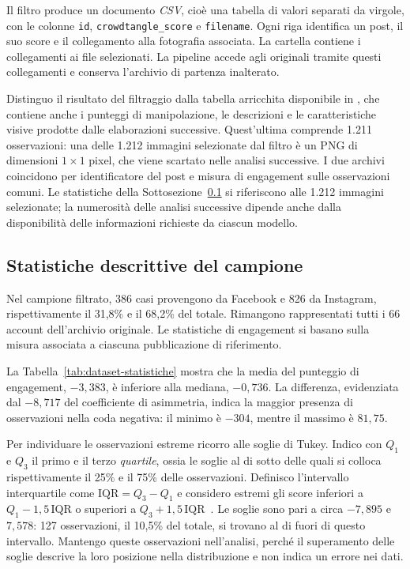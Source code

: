 Il filtro produce un documento \emph{CSV}, cioè una tabella di valori separati da virgole, con le colonne \texttt{id}, \texttt{crowdtangle\_score} e \texttt{filename}. Ogni riga identifica un post, il suo score e il collegamento alla fotografia associata. La cartella  contiene i collegamenti ai file selezionati. La pipeline accede agli originali tramite questi collegamenti e conserva l'archivio di partenza inalterato.

Distinguo il risultato del filtraggio dalla tabella arricchita disponibile in , che contiene anche i punteggi di manipolazione, le descrizioni e le caratteristiche visive prodotte dalle elaborazioni successive. Quest'ultima comprende 1.211 osservazioni: una delle 1.212 immagini selezionate dal filtro è un PNG di dimensioni $1 \times 1$ pixel, che viene scartato nelle analisi successive. I due archivi coincidono per identificatore del post e misura di engagement sulle osservazioni comuni. Le statistiche della Sottosezione~\ref{subsec:dataset-statistiche} si riferiscono alle 1.212 immagini selezionate; la numerosità delle analisi successive dipende anche dalla disponibilità delle informazioni richieste da ciascun modello.

\subsection{Statistiche descrittive del campione}
\label{subsec:dataset-statistiche}

Nel campione filtrato, 386 casi provengono da Facebook e 826 da Instagram, rispettivamente il 31,8\% e il 68,2\% del totale. Rimangono rappresentati tutti i 66 account dell'archivio originale. Le statistiche di engagement si basano sulla misura associata a ciascuna pubblicazione di riferimento.

La Tabella~\ref{tab:dataset-statistiche} mostra che la media del punteggio di engagement, $-3{,}383$, è inferiore alla mediana, $-0{,}736$. La differenza, evidenziata dal $-8{,}717$ del coefficiente di asimmetria, indica la maggior presenza di osservazioni nella coda negativa: il minimo è $-304$, mentre il massimo è $81{,}75$.

Per individuare le osservazioni estreme ricorro alle soglie di Tukey. Indico con $Q_1$ e $Q_3$ il primo e il terzo \emph{quartile}, ossia le soglie al di sotto delle quali si colloca rispettivamente il 25\% e il 75\% delle osservazioni. Definisco l'intervallo interquartile come $\mathrm{IQR}=Q_3-Q_1$ e considero estremi gli score inferiori a $Q_1-1{,}5\,\mathrm{IQR}$ o superiori a $Q_3+1{,}5\,\mathrm{IQR}$~\cite{tukey1977exploratory}. Le soglie sono pari a circa $-7{,}895$ e $7{,}578$: 127 osservazioni, il 10,5\% del totale, si trovano al di fuori di questo intervallo. Mantengo queste osservazioni nell'analisi, perché il superamento delle soglie descrive la loro posizione nella distribuzione e non indica un errore nei dati.

